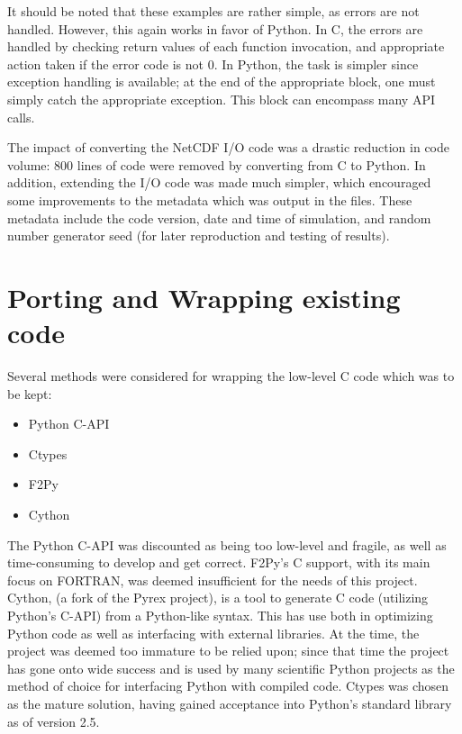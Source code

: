 \documentclass[twocolumn]{article}
\begin{document}
It should be noted that these examples are rather simple, as errors are not
handled. However, this again works in favor of Python. In C, the errors are
handled by checking return values of each function invocation, and appropriate
action taken if the error code is not 0. In Python, the task is simpler
since exception handling is available; at the end of the appropriate block, 
one must simply catch the appropriate exception. This block can encompass
many API calls.

The impact of converting the NetCDF I/O code was a drastic reduction in code
volume: 800 lines of code were removed by converting from C to Python. In
addition, extending the I/O code was made much simpler, which encouraged
some improvements to the metadata which was output in the files. These metadata
include the code version, date and time of simulation, and random number generator
seed (for later reproduction and testing of results).

\section{Porting and Wrapping existing code}
Several methods were considered for wrapping the low-level C code which was to
be kept:
\begin{itemize}
    \item Python C-API
    \item Ctypes
    \item F2Py
    \item Cython
\end{itemize}
The Python C-API was discounted as being too low-level and fragile, as well
as time-consuming to develop and get correct.  F2Py's C support, with its
main focus on FORTRAN, was deemed insufficient for the needs of this project.
Cython, (a fork of the Pyrex project), is a tool to generate C code (utilizing
Python's C-API) from a Python-like syntax. This has use both in optimizing
Python code as well as interfacing with external libraries. At the time, the
project was deemed too immature to be relied upon; since that time the project
has gone onto wide success and is used by many scientific Python projects
as the method of choice for interfacing Python with compiled code. Ctypes was
chosen as the mature solution, having gained acceptance into Python's standard
library as of version 2.5. \cite{ctypes}
\end{document}
